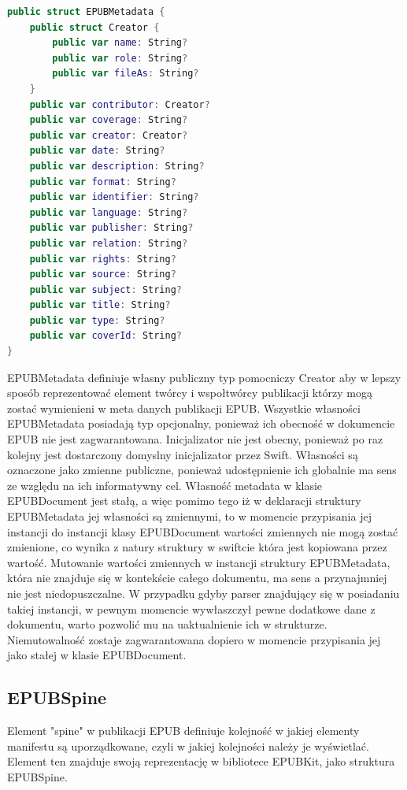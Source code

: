 \begin{lstlisting}[caption={Struktura EPUBMetadata.}, language=swift]
public struct EPUBMetadata {
    public struct Creator {
        public var name: String?
        public var role: String?
        public var fileAs: String?
    }
    public var contributor: Creator?
    public var coverage: String?
    public var creator: Creator?
    public var date: String?
    public var description: String?
    public var format: String?
    public var identifier: String?
    public var language: String?
    public var publisher: String?
    public var relation: String?
    public var rights: String?
    public var source: String?
    public var subject: String?
    public var title: String?
    public var type: String?
    public var coverId: String?
}
\end{lstlisting}

EPUBMetadata definiuje własny publiczny typ pomocniczy Creator aby w lepszy sposób reprezentować element twórcy i wspołtwórcy publikacji którzy mogą zostać wymienieni w meta danych publikacji EPUB. Wszystkie własności EPUBMetadata posiadają typ opcjonalny, ponieważ ich obecność w dokumencie EPUB nie jest zagwarantowana. Inicjalizator nie jest obecny, ponieważ po raz kolejny jest dostarczony domyslny inicjalizator przez Swift. Własności są oznaczone jako zmienne publiczne, ponieważ udostępnienie ich globalnie ma sens ze względu na ich informatywny cel. Własność metadata w klasie EPUBDocument jest stałą, a więc pomimo tego iż w deklaracji struktury EPUBMetadata jej własności są zmiennymi, to w momencie przypisania jej instancji do instancji klasy EPUBDocument wartości zmiennych nie mogą zostać zmienione, co wynika z natury struktury w swiftcie która jest kopiowana przez wartość. Mutowanie wartości zmiennych w instancji struktury EPUBMetadata, która nie znajduje się w kontekście całego dokumentu, ma sens a przynajmniej nie jest niedopuszczalne. W przypadku gdyby parser znajdujący się w posiadaniu takiej instancji, w pewnym momencie wywłaszczył pewne dodatkowe dane z dokumentu, warto pozwolić mu na uaktualnienie ich w strukturze. Niemutowalność zostaje zagwarantowana dopiero w momencie przypisania jej jako stałej w klasie EPUBDocument.

\subsection{EPUBSpine}

Element "spine" w publikacji EPUB definiuje kolejność w jakiej elementy manifestu są uporządkowane, czyli w jakiej kolejności należy je wyświetlać. Element ten znajduje swoją reprezentację w bibliotece EPUBKit, jako struktura EPUBSpine.

